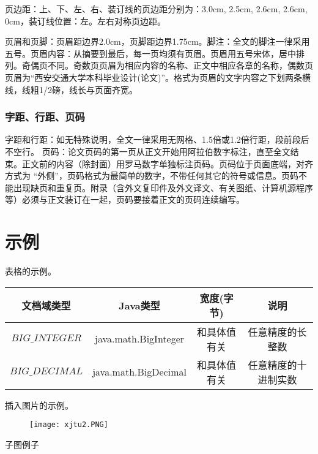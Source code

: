 \documentclass[Mac]{xjtuBSThesis}  %
\begin{document}
页边距：上、下、左、右、装订线的页边距分别为：3.0cm, 2.5cm, 2.6cm, 2.6cm, 0cm，装订线位置：左。左右对称页边距。

页眉和页脚：页眉距边界2.0cm，页脚距边界1.75cm。脚注：全文的脚注一律采用五号。页眉内容：从摘要到最后，每一页均须有页眉。页眉用五号宋体，居中排列。奇偶页不同。奇数页页眉为相应内容的名称、正文中相应各章的名称，偶数页页眉为“西安交通大学本科毕业设计(论文)”。格式为页眉的文字内容之下划两条横线，线粗1/2磅，线长与页面齐宽。
\subsubsection{字距、行距、页码}
字距和行距：如无特殊说明，全文一律采用无网格、1.5倍或1.2倍行距，段前段后不空行。
页码：论文页码的第一页从正文开始用阿拉伯数字标注，直至全文结束。正文前的内容（除封面）用罗马数字单独标注页码。页码位于页面底端，对齐方式为 “外侧”，页码格式为最简单的数字，不带任何其它的符号或信息。页码不能出现缺页和重复页。附录（含外文复印件及外文译文、有关图纸、计算机源程序等）必须与正文装订在一起，页码要接着正文的页码连续编写。


\section{示例}
表格的示例。

\begin{table}[htbp]
  \centering
  \begin{tabular}{cccc}
    \toprule[1.5pt]
    \textbf{文档域类型} & \textbf{Java类型} & \textbf{宽度(字节)} & \textbf{说明} \\
    \midrule[1pt]
    $BIG\_INTEGER$& java.math.BigInteger & 和具体值有关 & 任意精度的长整数 \\
    $BIG\_DECIMAL$ & java.math.BigDecimal & 和具体值有关 & 任意精度的十进制实数 \\
    \bottomrule[1.5pt]
  \end{tabular}

\end{table}

插入图片的示例。

\begin{figure}[htbp]
   \centering
   \texttt{[image: xjtu2.PNG]} %
   \label{fig:example}
\end{figure}

子图例子
\end{document}
